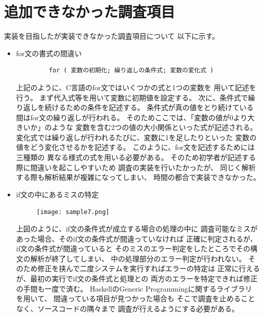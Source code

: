 \documentclass{csspaper}
\begin{document}
      \section{追加できなかった調査項目}
      実装を目指したが実装できなかった調査項目について
      以下に示す。
      \begin{itemize}
         \item for文の書式の間違い
         
         \begin{lstlisting}
         for ( 変数の初期化; 繰り返しの条件式; 変数の変化式 )
         \end{lstlisting}
         
         上記のように、C言語のfor文ではいくつかの式と1つの変数を
         用いて記述を行う。
         まず代入式等を用いて変数に初期値を設定する。
         次に、条件式で繰り返しを続けるための条件を記述する。
         条件式が真の値をとり続けている間はfor文の繰り返しが行われる。
         そのためここでは、「変数の値が0より大きいか」のような
         変数を含む2つの値の大小関係といった式が記述される。
         変化式では繰り返しが行われるたびに、変数に1を足したりといった
         変数の値をどう変化させるかを記述する。
         このように、for文を記述するためには三種類の
         異なる様式の式を用いる必要がある。
         そのため初学者が記述する際に間違いを起こしやすいため
         調査の実装を行いたかったが、
         同じく解析する際も解析結果が複雑になってしまい、
         時間の都合で実装できなかった。
         
         \item if文の中にあるミスの特定
         
         \begin{figure}[h]
            \centering
            \texttt{[image: sample7.png]}
         \end{figure}
         
         上図のように、if文の条件式が成立する場合の処理の中に
         調査可能なミスがあった場合、そのif文の条件式が間違っていなければ
         正確に判定されるが、if文の条件式が間違っていると
         そのミスのエラー判定をしたところでその構文の解析が終了してしまい、
         中の処理部分のエラー判定が行われない。
         そのため修正を挟んで二度システムを実行すればエラーの特定は
         正常に行えるが、最初の実行でif文の条件式と処理との
         両方のエラーを特定できれば修正の手間も一度で済む。
         HaskellのGeneric Programmingに関するライブラリ \cite{14}を用いて、
         間違っている項目が見つかった場合も
         そこで調査を止めることなく、ソースコードの隅々まで
         調査が行えるようにする必要がある。


\end{itemize}
\end{document}
